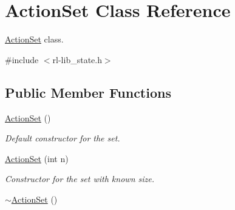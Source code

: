 \hypertarget{classActionSet}{\section{Action\-Set Class Reference}
\label{classActionSet}
}


\hyperlink{classActionSet}{Action\-Set} class.  




{\ttfamily \#include $<$rl-\/lib\-\_\-state.\-h$>$}

\subsection*{Public Member Functions}
\begin{DoxyCompactItemize}
\item 
\hyperlink{classActionSet_af1a45dd53e14b66eabf1a4e77df51c81}{Action\-Set} ()
\begin{DoxyCompactList}\small\item\em Default constructor for the set. \end{DoxyCompactList}\item 
\hyperlink{classActionSet_a4b5f488670ee207dbb3aac3f92e83bd3}{Action\-Set} (int n)
\begin{DoxyCompactList}\small\item\em Constructor for the set with known size. \end{DoxyCompactList}\item 
\hypertarget{classActionSet_a95eb8d8a76dfdda76cf4cbc67c6e070b}{\hyperlink{classActionSet_a95eb8d8a76dfdda76cf4cbc67c6e070b}{$\sim$\-Action\-Set} ()}\label{classActionSet_a95eb8d8a76dfdda76cf4cbc67c6e070b}


\end{DoxyCompactItemize}
